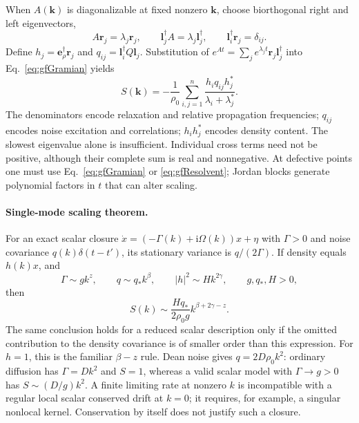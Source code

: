 \documentclass{article}
\begin{document}
When $A(\mathbf k)$ is diagonalizable at fixed nonzero $\mathbf k$, choose biorthogonal right and left eigenvectors,
\begin{equation}
    A\mathbf r_j=\lambda_j\mathbf r_j,\qquad
    \mathbf l_j^\dagger A=\lambda_j\mathbf l_j^\dagger,\qquad
    \mathbf l_i^\dagger\mathbf r_j=\delta_{ij}.
\end{equation}
Define $h_j=\mathbf e_\rho^\dagger\mathbf r_j$ and $q_{ij}=\mathbf l_i^\dagger Q\mathbf l_j$. Substitution of $e^{At}=\sum_j e^{\lambda_jt}\mathbf r_j\mathbf l_j^\dagger$ into Eq.~\eqref{eq:gfGramian} yields
\begin{equation}
    \boxed{S(\mathbf k)=-\frac1{\rho_0}\sum_{i,j=1}^n
    \frac{h_i q_{ij}h_j^*}{\lambda_i+\lambda_j^*}.}
    \label{eq:gfModes}
\end{equation}
The denominators encode relaxation and relative propagation frequencies; $q_{ij}$ encodes noise excitation and correlations; $h_i h_j^*$ encodes density content. The slowest eigenvalue alone is insufficient. Individual cross terms need not be positive, although their complete sum is real and nonnegative. At defective points one must use Eq.~\eqref{eq:gfGramian} or \eqref{eq:gfResolvent}; Jordan blocks generate polynomial factors in $t$ that can alter scaling.

\paragraph{Single-mode scaling theorem.}
For an exact scalar closure $\dot x=(-\Gamma(k)+\mathrm i\Omega(k))x+\eta$ with $\Gamma>0$ and noise covariance $q(k)\delta(t-t')$, its stationary variance is $q/(2\Gamma)$. If density equals $h(k)x$, and
\begin{equation}
    \Gamma\sim g k^z,\qquad q\sim q_* k^\beta,\qquad
    |h|^2\sim H k^{2\gamma},\qquad g,q_*,H>0,
\end{equation}
then
\begin{equation}
    S(k)\sim\frac{Hq_*}{2\rho_0g}k^{\beta+2\gamma-z}.
    \label{eq:gfScalarScaling}
\end{equation}
The same conclusion holds for a reduced scalar description only if the omitted contribution to the density covariance is of smaller order than this expression. For $h=1$, this is the familiar $\beta-z$ rule. Dean noise gives $q=2D\rho_0 k^2$: ordinary diffusion has $\Gamma=Dk^2$ and $S=1$, whereas a valid scalar model with $\Gamma\to g>0$ has $S\sim(D/g)k^2$. A finite limiting rate at nonzero $k$ is incompatible with a regular local scalar conserved drift at $k=0$; it requires, for example, a singular nonlocal kernel. Conservation by itself does not justify such a closure.
\end{document}
